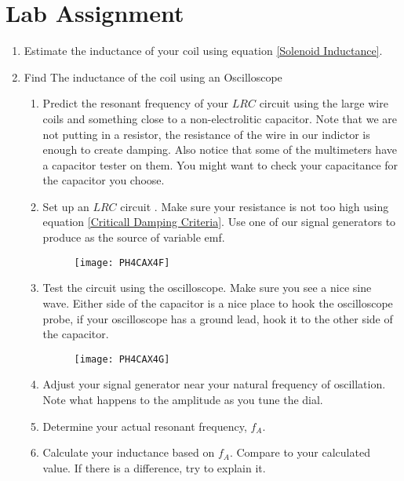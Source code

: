 \section{Lab Assignment}

\begin{enumerate}
\item Estimate the inductance of your coil using equation \ref{Solenoid
Inductance}.

\item Find The inductance of the coil using an Oscilloscope

\begin{enumerate}
\item Predict the resonant frequency of your $LRC$ circuit using the large
wire coils and something close to a non-electrolitic capacitor. Note that we
are not putting in a resistor, the resistance of the wire in our indictor is
enough to create damping. Also notice that some of the multimeters have a
capacitor tester on them. You might want to check your capacitance for the
capacitor you choose.

\item Set up an $LRC$ circuit . Make sure your resistance is not too high
using equation \ref{Criticall Damping Criteria}. Use one of our signal
generators to produce as the source of variable emf. \begin{figure}[h!]
\texttt{[image: PH4CAX4F]}
\end{figure}

\item Test the circuit using the oscilloscope. Make sure you see a nice sine
wave. Either side of the capacitor is a nice place to hook the oscilloscope
probe, if your oscilloscope has a ground lead, hook it to the other side of
the capacitor.\begin{figure}[h!]
\texttt{[image: PH4CAX4G]}
\end{figure}

\item Adjust your signal generator near your natural frequency of
oscillation. Note what happens to the amplitude as you tune the dial.

\item Determine your actual resonant frequency, $f_{A}$.

\item Calculate your inductance based on $f_{A}$. Compare to your calculated
value. If there is a difference, try to explain it.
\end{enumerate}
\end{enumerate}

\vfill%
